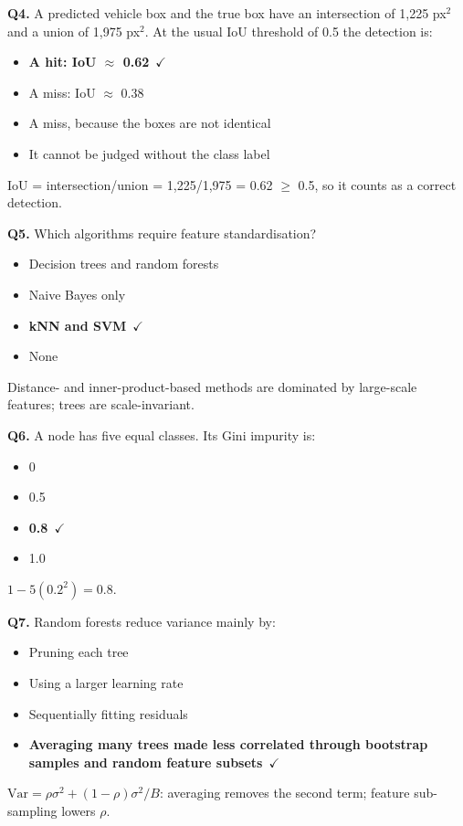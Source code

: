 \documentclass[11pt]{article}
\begin{document}
{\noindent\textbf{Q4.} A predicted vehicle box and the true box have an intersection of 1,225 px$^2$ and a union of 1,975 px$^2$. At the usual IoU threshold of 0.5 the detection is:\begin{itemize}[leftmargin=2.2em,itemsep=0pt,topsep=1pt]\item[\textbf{A.}] \textbf{A hit: IoU $\approx$ 0.62}~{\color{GrnN}$\checkmark$}\item[B.] A miss: IoU $\approx$ 0.38\item[C.] A miss, because the boxes are not identical\item[D.] It cannot be judged without the class label\end{itemize} IoU = intersection/union = 1,225/1,975 = 0.62 $\geq$ 0.5, so it counts as a correct detection.\par\medskip

\noindent\textbf{Q5.} Which algorithms require feature standardisation?\begin{itemize}[leftmargin=2.2em,itemsep=0pt,topsep=1pt]\item[A.] Decision trees and random forests\item[B.] Naive Bayes only\item[\textbf{C.}] \textbf{kNN and SVM}~{\color{GrnN}$\checkmark$}\item[D.] None\end{itemize} Distance- and inner-product-based methods are dominated by large-scale features; trees are scale-invariant.\par\medskip

\noindent\textbf{Q6.} A node has five equal classes. Its Gini impurity is:\begin{itemize}[leftmargin=2.2em,itemsep=0pt,topsep=1pt]\item[A.] 0\item[B.] 0.5\item[\textbf{C.}] \textbf{0.8}~{\color{GrnN}$\checkmark$}\item[D.] 1.0\end{itemize} $1-5(0.2^2)=0.8$.\par\medskip

\noindent\textbf{Q7.} Random forests reduce variance mainly by:\begin{itemize}[leftmargin=2.2em,itemsep=0pt,topsep=1pt]\item[A.] Pruning each tree\item[B.] Using a larger learning rate\item[C.] Sequentially fitting residuals\item[\textbf{D.}] \textbf{Averaging many trees made less correlated through bootstrap samples and random feature subsets}~{\color{GrnN}$\checkmark$}\end{itemize} $\text{Var}=\rho\sigma^2+(1-\rho)\sigma^2/B$: averaging removes the second term; feature sub-sampling lowers $\rho$.\par\medskip

}
\end{document}
